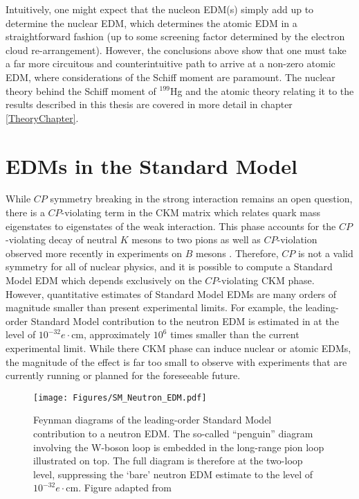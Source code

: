 \documentclass [10pt, twoside] {uwthesis}[2012/04/02]
\begin{document}
Intuitively, one might expect that the nucleon EDM(s) simply add up to determine the nuclear EDM, which determines the atomic EDM in a straightforward fashion (up to some screening factor determined by the electron cloud re-arrangement). However, the conclusions above show that one must take a far more circuitous and counterintuitive path to arrive at a non-zero atomic EDM, where considerations of the Schiff moment are paramount. The nuclear theory behind the Schiff moment of $^{199}$Hg and the atomic theory relating it to the results described in this thesis are covered in more detail in chapter \ref{TheoryChapter}.

\section{EDMs in the Standard Model}
While $CP$ symmetry breaking in the strong interaction remains an open question, there is a $CP$-violating term in the CKM matrix which relates quark mass eigenstates to eigenstates of the weak interaction. This phase accounts for the $CP$-violating decay of neutral $K$ mesons to two pions \cite{1964_Fitch_Cronin_CP_violating_Kaon_Decay} as well as $CP$-violation observed more recently in experiments on $B$ mesons \cite{2001_Belle_B_meson_CP_violation, 2001_BaBar_B_meson_CP_violation}. Therefore, $CP$ is not a valid symmetry for all of nuclear physics, and it is possible to compute a Standard Model EDM which depends exclusively on the $CP$-violating CKM phase. However, quantitative estimates of Standard Model EDMs are many orders of magnitude smaller than present experimental limits. For example, the leading-order Standard Model contribution to the neutron EDM is estimated in \cite{2005_Pospelov_Ritz_EDM_review} at the level of $10^{-32} e\cdot\text{cm}$, approximately $10^6$ times smaller than the current experimental limit. While there CKM phase can induce nuclear or atomic EDMs, the magnitude of the effect is far too small to observe with experiments that are currently running or planned for the foreseeable future.

\begin{figure}
\begin{center}
\texttt{[image: Figures/SM\_Neutron\_EDM.pdf]}
\end{center}
\caption[Leading-order neutron EDM contribution from Standard Model physics]%
{\narrower Feynman diagrams of the leading-order Standard Model contribution to a neutron EDM. The so-called ``penguin'' diagram involving the W-boson loop is embedded in the long-range pion loop illustrated on top. The full diagram is therefore at the two-loop level, suppressing the `bare' neutron EDM estimate to the level of $10^{-32} e\cdot\text{cm}$. Figure adapted from \cite{2005_Pospelov_Ritz_EDM_review}}
\end{figure}
\end{document}
